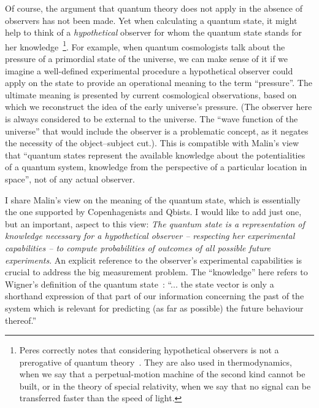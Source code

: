 \documentclass[12pt,a4]{article}
\begin{document}
Of course, the argument that quantum theory does not apply in the absence of observers has not been made. Yet when calculating a quantum state, it might help to think of a {\it hypothetical} observer for whom the quantum state stands for her knowledge~\footnote{Peres correctly notes that considering hypothetical observers is not a prerogative of quantum theory~\cite{peres}. They are also used in thermodynamics, when we say that a perpetual-motion machine of the second kind cannot be built, or in the theory of special relativity, when we say that no signal can be transferred faster than the speed of light.}. For example, when quantum cosmologists talk about the pressure of a primordial state of the universe, we can make sense of it if we imagine a well-defined experimental procedure a  hypothetical observer could apply on the state to provide an operational meaning to the term ``pressure''. The ultimate meaning is presented by current cosmological observations, based on which we reconstruct the idea of the early universe's pressure. (The observer here is always considered to be external to the universe. The ``wave function of the universe'' that would include the observer is a problematic concept, as it negates the necessity of the object--subject cut.). This is compatible with Malin's view~\cite{malin} that ``quantum states represent the available knowledge about the potentialities of a quantum system, knowledge from the perspective of a particular location in space'', not of any actual observer. 

I share Malin's view on the meaning of the quantum state, which is essentially the one supported by Copenhagenists and Qbists. I would like to add just one, but an important, aspect to this view: 
{\em The quantum state is a representation of knowledge necessary for a hypothetical  observer -- respecting her experimental capabilities -- to compute probabilities of outcomes of all possible future experiments}. An explicit reference to the observer's experimental capabilities is crucial to address the big measurement problem. The ``knowledge'' here refers to Wigner's definition of the quantum state~\cite{wigner}: ``... the state vector is only a shorthand expression of that part of our information concerning the past of the system which is relevant for predicting (as far as possible) the future behaviour thereof.''
\end{document}
